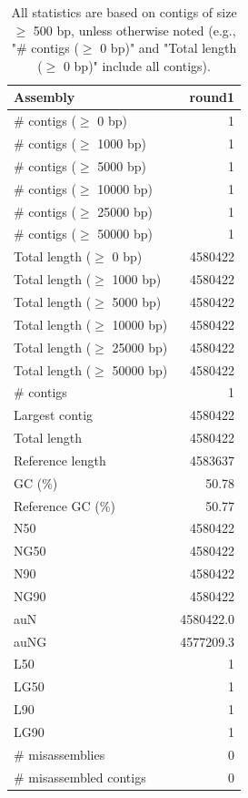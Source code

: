 \documentclass[12pt,a4paper]{article}
\begin{document}
\begin{table}[ht]
\begin{center}
\caption{All statistics are based on contigs of size $\geq$ 500 bp, unless otherwise noted (e.g., "\# contigs ($\geq$ 0 bp)" and "Total length ($\geq$ 0 bp)" include all contigs).}
\begin{tabular}{|l*{1}{|r}|}
\hline
Assembly & round1 \\ \hline
\# contigs ($\geq$ 0 bp) & 1 \\ \hline
\# contigs ($\geq$ 1000 bp) & 1 \\ \hline
\# contigs ($\geq$ 5000 bp) & 1 \\ \hline
\# contigs ($\geq$ 10000 bp) & 1 \\ \hline
\# contigs ($\geq$ 25000 bp) & 1 \\ \hline
\# contigs ($\geq$ 50000 bp) & 1 \\ \hline
Total length ($\geq$ 0 bp) & 4580422 \\ \hline
Total length ($\geq$ 1000 bp) & 4580422 \\ \hline
Total length ($\geq$ 5000 bp) & 4580422 \\ \hline
Total length ($\geq$ 10000 bp) & 4580422 \\ \hline
Total length ($\geq$ 25000 bp) & 4580422 \\ \hline
Total length ($\geq$ 50000 bp) & 4580422 \\ \hline
\# contigs & 1 \\ \hline
Largest contig & 4580422 \\ \hline
Total length & 4580422 \\ \hline
Reference length & 4583637 \\ \hline
GC (\%) & 50.78 \\ \hline
Reference GC (\%) & 50.77 \\ \hline
N50 & 4580422 \\ \hline
NG50 & 4580422 \\ \hline
N90 & 4580422 \\ \hline
NG90 & 4580422 \\ \hline
auN & 4580422.0 \\ \hline
auNG & 4577209.3 \\ \hline
L50 & 1 \\ \hline
LG50 & 1 \\ \hline
L90 & 1 \\ \hline
LG90 & 1 \\ \hline
\# misassemblies & 0 \\ \hline
\# misassembled contigs & 0 \\ \hline

\end{tabular}
\end{center}
\end{table}
\end{document}
